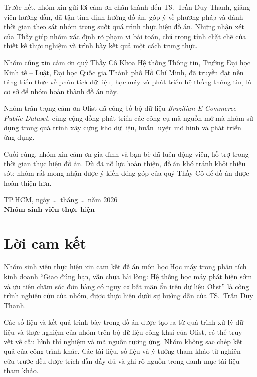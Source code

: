 \documentclass[12pt,a4paper]{report}
\begin{document}
Trước hết, nhóm xin gửi lời cảm ơn chân thành đến TS.~Trần Duy Thanh, giảng viên hướng dẫn, đã tận tình định hướng đồ án, góp ý về phương pháp và dành thời gian theo sát nhóm trong suốt quá trình thực hiện đồ án. Những nhận xét của Thầy giúp nhóm xác định rõ phạm vi bài toán, chú trọng tính chặt chẽ của thiết kế thực nghiệm và trình bày kết quả một cách trung thực.

Nhóm cũng xin cảm ơn quý Thầy Cô Khoa Hệ thống Thông tin, Trường Đại học Kinh tế -- Luật, Đại học Quốc gia Thành phố Hồ Chí Minh, đã truyền đạt nền tảng kiến thức về phân tích dữ liệu, học máy và phát triển hệ thống thông tin, là cơ sở để nhóm hoàn thành đồ án này.

Nhóm trân trọng cảm ơn Olist đã công bố bộ dữ liệu \emph{Brazilian E-Commerce Public Dataset}, cùng cộng đồng phát triển các công cụ mã nguồn mở mà nhóm sử dụng trong quá trình xây dựng kho dữ liệu, huấn luyện mô hình và phát triển ứng dụng.

Cuối cùng, nhóm xin cảm ơn gia đình và bạn bè đã luôn động viên, hỗ trợ trong thời gian thực hiện đồ án. Dù đã nỗ lực hoàn thiện, đồ án khó tránh khỏi thiếu sót; nhóm rất mong nhận được ý kiến đóng góp của quý Thầy Cô để đồ án được hoàn thiện hơn.

\vspace{1cm}
\begin{flushright}
\begin{minipage}{0.5\linewidth}\centering
TP.HCM, ngày \ldots\ tháng \ldots\ năm 2026\\
\textbf{Nhóm sinh viên thực hiện}
\end{minipage}
\end{flushright}

\chapter*{Lời cam kết}

Nhóm sinh viên thực hiện xin cam kết đồ án môn học Học máy trong phân tích kinh doanh ``Giao đúng hạn, vẫn chưa hài lòng: Hệ thống học máy phát hiện sớm và ưu tiên chăm sóc đơn hàng có nguy cơ bất mãn ẩn trên dữ liệu Olist'' là công trình nghiên cứu của nhóm, được thực hiện dưới sự hướng dẫn của TS.~Trần Duy Thanh.

Các số liệu và kết quả trình bày trong đồ án được tạo ra từ quá trình xử lý dữ liệu và thực nghiệm của nhóm trên bộ dữ liệu công khai của Olist, có thể truy vết về cấu hình thí nghiệm và mã nguồn tương ứng. Nhóm không sao chép kết quả của công trình khác. Các tài liệu, số liệu và ý tưởng tham khảo từ nghiên cứu trước đều được trích dẫn đầy đủ và ghi rõ nguồn trong danh mục tài liệu tham khảo.
\end{document}
